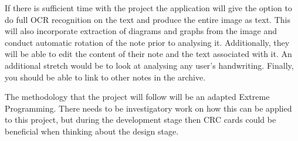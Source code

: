 \documentclass[11pt,fleqn,twoside]{article}
\begin{document}
If there is sufficient time with the project the application will give the option to do full OCR recognition on the text and produce the entire image as text. This will also incorporate extraction of diagrams and graphs from the image and conduct automatic rotation of the note prior to analysing it. Additionally, they will be able to edit the content of their note and the text associated with it. An additional stretch would be to look at analysing any user's handwriting. Finally, you should be able to link to other notes in the archive.

The methodology that the project will follow will be an adapted Extreme Programming. There needs to be investigatory work on how this can be applied to this project, but during the development stage then CRC cards could be beneficial when thinking about the design stage.
\end{document}
